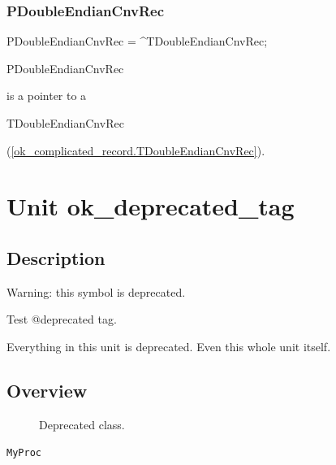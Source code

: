 \documentclass{report}
\newif\ifpdf
\begin{document}
\subsection*{PDoubleEndianCnvRec}
\fi
\label{ok_complicated_record-PDoubleEndianCnvRec}
\begin{list}{}{
\setlength{\itemindent}{0cm}
\setlength{\listparindent}{0cm}
\setlength{\leftmargin}{\evensidemargin}
\addtolength{\leftmargin}{\tmplength}
\settowidth{\labelsep}{X}
\addtolength{\leftmargin}{\labelsep}
\setlength{\labelwidth}{\tmplength}
}
\item[\textbf{Declaration}\hfill]
\ifpdf
\begin{flushleft}
\fi
\begin{ttfamily}
PDoubleEndianCnvRec = {\^{}}TDoubleEndianCnvRec;\end{ttfamily}

\ifpdf
\end{flushleft}
\fi

\par
\item[\textbf{Description}]
\begin{ttfamily}PDoubleEndianCnvRec\end{ttfamily} is a pointer to a \begin{ttfamily}TDoubleEndianCnvRec\end{ttfamily}(\ref{ok_complicated_record.TDoubleEndianCnvRec}).

\end{list}
\chapter{Unit ok{\_}deprecated{\_}tag}
\label{ok_deprecated_tag}
\section{Description}
Warning: this symbol is deprecated.

Test @deprecated tag.\hfill\vspace*{1ex}



Everything in this unit is deprecated. Even this whole unit itself.


\section{Overview}
\begin{description}
\item[\texttt{\begin{ttfamily}TMyClass\end{ttfamily} Class}] Deprecated class.
\end{description}
\begin{description}
\item[\texttt{MyProc}]
\end{description}
\end{document}

